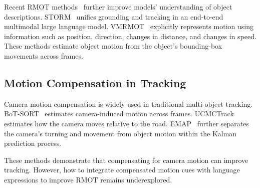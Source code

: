 \documentclass{article}
\providecommand{\DIFdelbegin}{} %
\providecommand{\DIFdelend}{} %
\providecommand{\DIFscaledelfig}{0.5}
\newlength{\DIFdelgraphicswidth} %
\newlength{\DIFdelgraphicsheight} %
\providecommand{\DIFdelincludegraphics}[2][]{%
\sbox{\DIFdelgraphicsbox}{\DIFOincludegraphics[#1]{#2}}%
\settoboxwidth{\DIFdelgraphicswidth}{\DIFdelgraphicsbox} %
\settoboxtotalheight{\DIFdelgraphicsheight}{\DIFdelgraphicsbox} %
\scalebox{\DIFscaledelfig}{%
\parbox[b]{\DIFdelgraphicswidth}{\usebox{\DIFdelgraphicsbox}\\[-\baselineskip] \rule{\DIFdelgraphicswidth}{0em}}\llap{\resizebox{\DIFdelgraphicswidth}{\DIFdelgraphicsheight}{%
\setlength{\unitlength}{\DIFdelgraphicswidth}%
\begin{picture}(1,1)%
\thicklines\linethickness{2pt} %
{\color[rgb]{1,0,0}\put(0,0){\framebox(1,1){}}}%
{\color[rgb]{1,0,0}\put(0,0){\line( 1,1){1}}}%
{\color[rgb]{1,0,0}\put(0,1){\line(1,-1){1}}}%
\end{picture}%
}\hspace*{3pt}}} %
} %
\DeclareRobustCommand{\DIFdelbegin}{\DIFOdelbegin \let\includegraphics\DIFdelincludegraphics} %
\DeclareRobustCommand{\DIFdelend}{\DIFOaddend \let\includegraphics\DIFOincludegraphics} %
\begin{document}
Recent RMOT methods~\cite{deeprmot} further improve models' understanding of object descriptions. STORM~\cite{storm} unifies grounding and tracking in an end-to-end multimodal large language model. VMRMOT~\cite{vmrmot} explicitly represents motion using information such as position, direction, changes in distance, and changes in speed. These methods estimate object motion from the object's bounding-box movements across frames.

\DIFdelbegin %

\DIFdelend \subsection{Motion Compensation in Tracking}
Camera motion compensation is widely used in traditional multi-object tracking. BoT-SORT~\cite{botsort} estimates camera-induced motion across frames. UCMCTrack~\cite{ucmctrack} estimates how the camera moves relative to the road. EMAP~\cite{emap} further separates the camera's turning and movement from object motion within the Kalman prediction process.

These methods demonstrate that compensating for camera motion can improve tracking. However, how to integrate compensated motion cues with language expressions to improve RMOT remains underexplored.

\DIFdelbegin %
\end{document}
